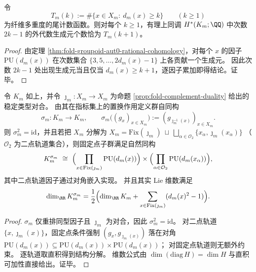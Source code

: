 \begin{corollary}[纤维谱尾分布的拓扑读出]\label{cor:fold-tail-topological-readout}
令
\[
T_m(k):=\#\{x\in X_m:\ d_m(x)\ge k\}\qquad(k\ge 1)
\]
为纤维多重度的尾计数函数。则对每个 \(k\ge 1\)，有理上同调 \(H^\ast(K_m;\QQ)\) 中次数 \(2k-1\) 的外代数生成元个数恰为 \(T_m(k+1)\)。
\end{corollary}
\begin{proof}
由定理 \ref{thm:fold-groupoid-aut0-rational-cohomology}，对每个 \(x\) 的因子 \(\mathrm{PU}(d_m(x))\) 在次数集合 \(\{3,5,\dots,2d_m(x)-1\}\) 上各贡献一个生成元。
因此次数 \(2k-1\) 处出现生成元当且仅当 \(d_m(x)\ge k+1\)，逐因子累加即得结论。证毕。
\end{proof}



\begin{proposition}\label{prop:fold-groupoid-aut0-complement-fixed-subgroup}
令 \(K_m\) 如上，并令 \(\jmath_m:X_m\to X_m\) 为命题 \ref{prop:fold-complement-duality} 给出的稳定类型对合。
由其在指标集上的置换作用定义群自同构
\[
\sigma_m:K_m\to K_m,\qquad
\sigma_m\bigl((g_x)_{x\in X_m}\bigr):=(g_{\jmath_m^{-1}(x)})_{x\in X_m}.
\]
则 \(\sigma_m^2=\mathrm{id}\)，并且若把 \(X_m\) 分解为
\(
X_m=\mathrm{Fix}(\jmath_m)\ \sqcup\ \bigsqcup_{\alpha\in\mathcal O_2}\{x_\alpha,\jmath_m(x_\alpha)\}
\)
（\(\mathcal O_2\) 为二点轨道集合），则固定点子群满足自然同构
\[
K_m^{\sigma_m}\ \cong\
\Bigl(\prod_{x\in \mathrm{Fix}(\jmath_m)}\mathrm{PU}(d_m(x))\Bigr)\times
\Bigl(\prod_{\alpha\in\mathcal O_2}\mathrm{PU}(d_m(x_\alpha))\Bigr),
\]
其中二点轨道因子通过对角嵌入实现。
并且其实 Lie 维数满足
\[
\dim_{\RR}K_m^{\sigma_m}
=\frac12\Bigl(\dim_{\RR}K_m+\sum_{x\in \mathrm{Fix}(\jmath_m)}(d_m(x)^2-1)\Bigr).
\]
\end{proposition}
\begin{proof}
\(\sigma_m\) 仅重排同型因子且 \(\jmath_m\) 为对合，因此 \(\sigma_m^2=\mathrm{id}\)。
对二点轨道 \(\{x,\jmath_m(x)\}\)，固定点条件强制 \((g_x,g_{\jmath_m(x)})\) 落在对角 \(\mathrm{PU}(d_m(x))\subseteq \mathrm{PU}(d_m(x))\times \mathrm{PU}(d_m(x))\)；
对固定点轨道则无额外约束。
逐轨道取直积得到结构分解。
维数公式由 \(\dim(\mathrm{diag}\,H)=\dim H\) 与直积可加性直接给出。证毕。
\end{proof}

